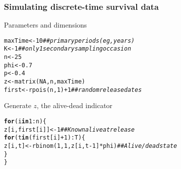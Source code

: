 \documentclass[color=usenames,dvipsnames]{beamer}\usepackage[]{graphicx}\usepackage[]{color}
\makeatletter
\newcommand{\hlnum}[1]{\textcolor[rgb]{0.69,0.494,0}{#1}}%
\newcommand{\hlcom}[1]{\textcolor[rgb]{0.514,0.506,0.514}{\textit{#1}}}%
\newcommand{\hlopt}[1]{\textcolor[rgb]{0,0,0}{#1}}%
\newcommand{\hlstd}[1]{\textcolor[rgb]{0,0,0}{#1}}%
\newcommand{\hlkwa}[1]{\textcolor[rgb]{0,0,0}{\textbf{#1}}}%
\newcommand{\hlkwb}[1]{\textcolor[rgb]{0,0.341,0.682}{#1}}%
\newcommand{\hlkwd}[1]{\textcolor[rgb]{0.004,0.004,0.506}{#1}}%
\newenvironment{kframe}{%
 \def\at@end@of@kframe{}%
 \ifinner\ifhmode%
  \def\at@end@of@kframe{\end{minipage}}%
  \begin{minipage}{\columnwidth}%
 \fi\fi%
 \def\FrameCommand##1{\hskip\@totalleftmargin \hskip-\fboxsep
 \colorbox{shadecolor}{##1}\hskip-\fboxsep
     \hskip-\linewidth \hskip-\@totalleftmargin \hskip\columnwidth}%
 \MakeFramed {\advance\hsize-\width
   \@totalleftmargin\z@ \linewidth\hsize
   \@setminipage}}%
 {\par\unskip\endMakeFramed%
 \at@end@of@kframe}
\newenvironment{knitrout}{}{} %
\makeatother
\begin{document}





\begin{frame}[fragile]
  \frametitle{Simulating discrete-time survival data}
  {%
    Parameters and dimensions}
\begin{knitrout}\footnotesize
{}\color{fgcolor}\begin{kframe}
\begin{alltt}
\hlstd{maxTime} \hlkwb{<-} \hlnum{10}               \hlcom{## primary periods (eg, years)}
\hlstd{K} \hlkwb{<-} \hlnum{1}                      \hlcom{## only 1 secondary sampling occasion}
\hlstd{n} \hlkwb{<-} \hlnum{25}
\hlstd{phi} \hlkwb{<-} \hlnum{0.7}
\hlstd{p} \hlkwb{<-} \hlnum{0.4}
\hlstd{z} \hlkwb{<-} \hlkwd{matrix}\hlstd{(}\hlnum{NA}\hlstd{, n, maxTime)}
\hlstd{first} \hlkwb{<-} \hlkwd{rpois}\hlstd{(n,} \hlnum{1}\hlstd{)}\hlopt{+}\hlnum{1} \hlcom{## random release dates}
\end{alltt}
\end{kframe}
\end{knitrout}
\pause
\vfill
{%
  Generate $z$, the alive-dead indicator}
\begin{knitrout}\footnotesize
{}\color{fgcolor}\begin{kframe}
\begin{alltt}
\hlkwa{for}\hlstd{(i} \hlkwa{in} \hlnum{1}\hlopt{:}\hlstd{n) \{}
    \hlstd{z[i,first[i]]} \hlkwb{<-} \hlnum{1}  \hlcom{## Known alive at release}
    \hlkwa{for}\hlstd{(t} \hlkwa{in} \hlstd{(first[i]}\hlopt{+}\hlnum{1}\hlstd{)}\hlopt{:}\hlstd{T) \{}
        \hlstd{z[i,t]} \hlkwb{<-} \hlkwd{rbinom}\hlstd{(}\hlnum{1}\hlstd{,} \hlnum{1}\hlstd{, z[i,t}\hlopt{-}\hlnum{1}\hlstd{]}\hlopt{*}\hlstd{phi)} \hlcom{## Alive/dead state}
    \hlstd{\}}
\hlstd{\}}
\end{alltt}
\end{kframe}
\end{knitrout}
\end{frame}
\end{document}
